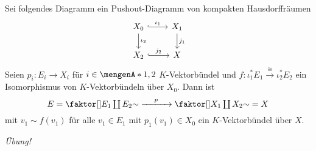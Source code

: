 \begin{lemma}[label=sub:37]
Sei folgendes Diagramm ein Pushout-Diagramm von kompakten Hausdorffräumen
\[
	\begin{tikzcd}
		X_0 \rar[hook,"\iota_1"] \dar["\iota_2"]& X_1 \dar["j_1"] \\
		X_2 \rar[hook,"j_2"] & X
	\end{tikzcd}
\]
Seien $p_i \colon E_i \to X_i$ für $i \in \set{1,2}$ $K$-Vektorbündel und $f \colon \iota_1^* E_1 \xrightarrow{\cong} \iota_2^* E_2 $ ein Isomorphismus von $K$-Vektorbündeln 
über $X_0$. Dann ist
\[
	E = \Faktor{E_1 \coprod E_2}{\sim} \xrightarrow{\minwidthbox{p}{3em}} \Faktor{X_1 \coprod X_2 }{\sim}=X
\]
mit $v_1 \sim f(v_1)$ für alle $v_1 \in E_1$ mit $p_1(v_1) \in X_0$ ein $K$-Vektorbündel über $X$.	
\end{lemma}
\begin{beweis}
\emph{Übung!}
\end{beweis}

